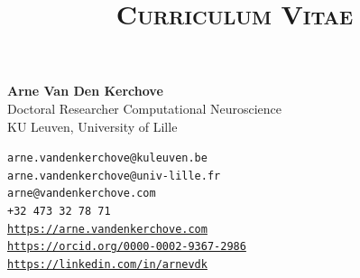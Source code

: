 \documentclass[10pt,a4paper]{article}
\title{\textsc{Curriculum Vitae}}
\date{}
\begin{document}
\maketitle
\begin{minipage}[b]{.7\linewidth}
	\Large \textbf{Arne Van Den Kerchove}\\
	\normalsize Doctoral Researcher Computational Neuroscience\\
	KU Leuven, University of Lille
  \bigskip

  \texttt{arne.vandenkerchove@kuleuven.be \\
  arne.vandenkerchove@univ-lille.fr \\
  arne@vandenkerchove.com \\
  +32 473 32 78 71 \\
	\url{https://arne.vandenkerchove.com}\\
	\url{https://orcid.org/0000-0002-9367-2986} \\
  \url{https://linkedin.com/in/arnevdk} \\}

\end{minipage}%
\end{document}
